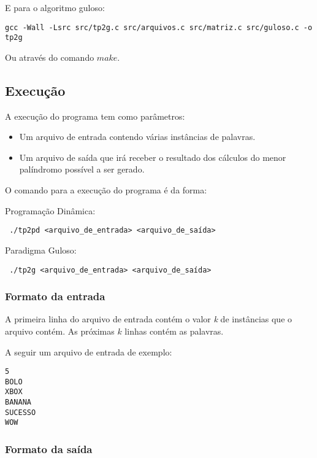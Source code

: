 \documentclass[12pt]{article}
\begin{document}
E para o algoritmo guloso:
\begin{footnotesize}
\begin{verbatim}
gcc -Wall -Lsrc src/tp2g.c src/arquivos.c src/matriz.c src/guloso.c -o tp2g \end{verbatim}
\end{footnotesize}

Ou através do comando $make$.

\subsection{Execução}

A execução do programa tem como parâmetros:
\begin{itemize}
\item Um arquivo de entrada contendo várias instâncias de palavras.
\item Um arquivo de saída que irá receber o resultado dos cálculos do menor palíndromo possível a ser gerado.
\end{itemize}

O comando para a execução do programa é da forma:

Programação Dinâmica:
\begin{footnotesize}
\begin{verbatim} ./tp2pd <arquivo_de_entrada> <arquivo_de_saída>\end{verbatim}
\end{footnotesize}

Paradigma Guloso:
\begin{footnotesize}
\begin{verbatim} ./tp2g <arquivo_de_entrada> <arquivo_de_saída>\end{verbatim}
\end{footnotesize}

\subsubsection{Formato da entrada}

A primeira linha do arquivo de entrada contém o valor \textit{k} de instâncias que o arquivo contém. As próximas $k$ linhas contém as palavras.

A seguir um arquivo de entrada de exemplo:

\begin{verbatim}
5
BOLO
XBOX
BANANA
SUCESSO
WOW
\end{verbatim}

\subsubsection{Formato da saída}
\end{document}
